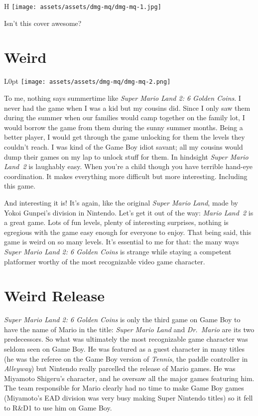 \documentclass{book}
\begin{document}
\begin{wrapfigure}{H}{\linewidth}
\vskip 4pt
\centering \texttt{[image: assets/assets/dmg-mq/dmg-mq-1.jpg]}\par\pagetwodescription Isn’t this cover awesome?\end{wrapfigure}
\clearpage

\FloatBarrier\needspace{5pt}\section*{Weird}\nopagebreak[4]

\begin{wrapfigure}{L}{0pt} \texttt{[image: assets/assets/dmg-mq/dmg-mq-2.png]}\end{wrapfigure}
To me, nothing says summertime like \emph{Super Mario Land 2: 6 Golden Coins}. I never had the game when I was a kid but my cousins did. Since I only saw them during the summer when our families would camp together on the family lot, I would borrow the game from them during the sunny summer months. Being a better player, I would get through the game unlocking for them the levels they couldn’t reach. I was kind of the Game Boy idiot savant; all my cousins would dump their games on my lap to unlock stuff for them. In hindsight \emph{Super Mario Land 2} is laughably easy. When you’re a child though you have terrible hand-eye coordination. It makes everything more difficult but more interesting. Including this game.

And interesting it is! It’s again, like the original \emph{Super Mario Land}, made by Yokoi Gunpei’s division in Nintendo. Let’s get it out of the way: \emph{Mario Land 2} is a great game. Lots of fun levels, plenty of interesting surprises, nothing is egregious with the game easy enough for everyone to enjoy. That being said, this game is weird on so many levels. It’s essential to me for that: the many ways \emph{Super Mario Land 2: 6 Golden Coins} is strange while staying a competent platformer worthy of the most recognizable video game character.

\FloatBarrier\needspace{5pt}\section*{Weird Release}\nopagebreak[4]

\emph{Super Mario Land 2: 6 Golden Coins} is only the third game on Game Boy to have the name of Mario in the title: \emph{Super Mario Land} and \emph{Dr. Mario} are its two predecessors. So what was ultimately the most recognizable game character was seldom seen on Game Boy. He was featured as a guest character in many titles (he was the referee on the Game Boy version of \emph{Tennis}, the paddle controller in \emph{Alleyway}) but Nintendo really parcelled the release of Mario games. He was Miyamoto Shigeru’s character, and he oversaw all the major games featuring him. The team responsible for Mario clearly had no time to make Game Boy games (Miyamoto’s EAD division was very busy making Super Nintendo titles) so it fell to R\&D1 to use him on Game Boy.
\end{document}
